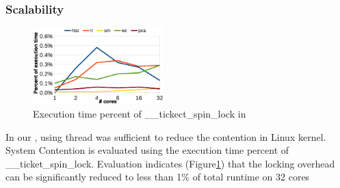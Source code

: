 



\subsubsection{Scalability}



 
\begin{figure}[!h!t]  
	\centering
	\includegraphics[width=0.45\textwidth]{eps/dmr_spinlock.eps}
	\caption{Execution time percent of \_\_tickect\_spin\_lock in \myds}
	\label{fig:smr:spinlock}
\end{figure}

In our \myds, using \myth thread was sufficient to reduce the contention in Linux kernel. 
System Contention is evaluated using the execution time percent of \_\_ticket\_spin\_lock. 
Evaluation indicates (Figure\ref{fig:smr:spinlock}) that the locking overhead can be significantly reduced to less than 1\% of total runtime on 32 cores

